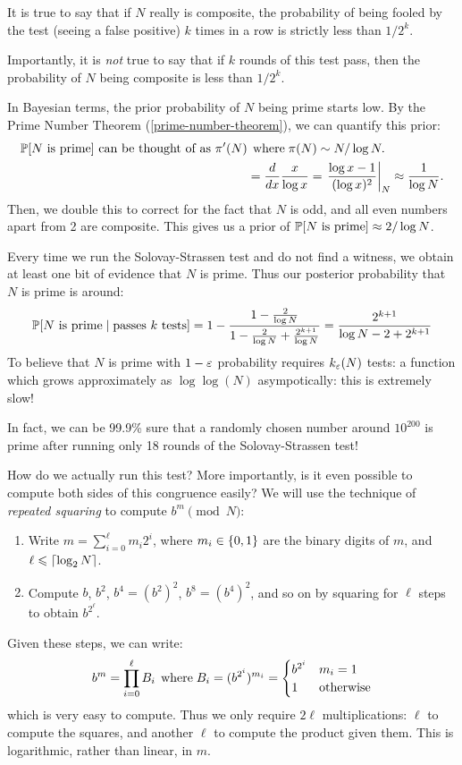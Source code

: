 \documentclass{article}
\begin{document}
\begin{remark}
	It is true to say that if $N$ really is composite, the probability of being fooled by the test (seeing a false positive) $k$ times in a row is strictly less than $1/2^k$.

	Importantly, it is \textit{not} true to say that if $k$ rounds of this test pass, then the probability of $N$ being composite is less than $1/2^k$.
	
	In Bayesian terms, the prior probability of $N$ being prime starts low. By the Prime Number Theorem (\ref{prime-number-theorem}), we can quantify this prior:
	\begin{align*}
    \P[N \text{ is prime}] \text{ can be thought of as } \pi'(N) &\where \pi(N) \sim N/\log N. \\
    &= \frac{d}{dx} \frac{x}{\log x} =
    \left. \frac{\log x-1}{(\log x)^{2}} \right|_N  \approx \frac{1}{\log N}.
	\end{align*}
	Then, we double this to correct for the fact that $N$ is odd, and all even numbers apart from 2 are composite. This gives us a prior of $\P[N \text{ is prime}] \approx 2/\log N$.

	Every time we run the Solovay-Strassen test and do not find a witness, we obtain at least one bit of evidence that $N$ is prime. Thus our posterior probability that $N$ is prime is around:
	\[
	\P[N \text{ is prime} \mid \text{passes $k$ tests}] =
	1 - \frac{1-\frac{2}{\log N}}{1-\frac{2}{\log N}+\frac{2^{k+1}}{\log N}} = 
	\frac{2^{k+1}}{\log N-2+2^{k+1}}
	\]
	To believe that $N$ is prime with $1 - \eps$ probability requires $k_\eps(N)$ tests: a function which grows approximately as $\log \log (N)$ asympotically: this is extremely slow!
	
	In fact, we can be 99.9\% sure that a randomly chosen number around $10^{200}$ is prime after running only 18 rounds of the Solovay-Strassen test!
\end{remark}

How do we actually run this test? More importantly, is it even possible to compute both sides of this congruence easily? We will use the technique of \textit{repeated squaring} to compute $b^m \pmod N$:
\begin{enumerate}
    \item Write $m = \sum_{i=0}^\ell m_i 2^i$, where $m_i \in \set{0,1}$ are the binary digits of $m$, and $\ell \leq \ceil{\log_2 N}$.
    \item Compute $b$, $b^2$, $b^4 = (b^2)^2$, $b^8 = (b^4)^2$, and so on by squaring for $\ell$ steps to obtain $b^{2^\ell}$.
\end{enumerate}
Given these steps, we can write:
\[
b^m = \prod_{i=0}^\ell B_i
\where B_i = (b^{2^i})^{m_i} =
\begin{cases}
	b^{2^i} & m_i = 1 \\
	1 & \!\otherwise
\end{cases}
\]
which is very easy to compute. Thus we only require $2\ell$ multiplications: $\ell$ to compute the squares, and another $\ell$ to compute the product given them. This is logarithmic, rather than linear, in $m$.
\end{document}
